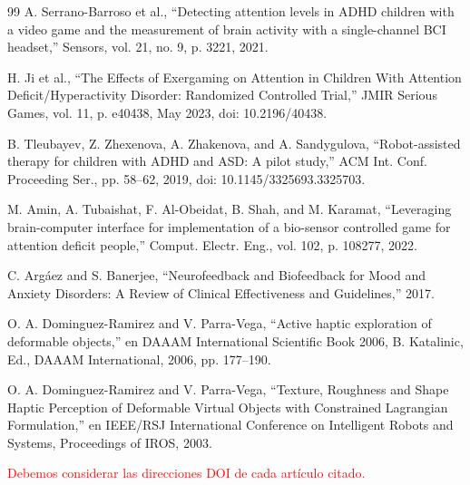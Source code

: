 \documentclass[letterpaper, 10 pt, conference]{ieeeconf}
\begin{document}
\begin{thebibliography}{99}
A. Serrano-Barroso et al., “Detecting attention levels in ADHD children with a video game and the measurement of brain activity with a single-channel BCI headset,” Sensors, vol. 21, no. 9, p. 3221, 2021.

H. Ji et al., “The Effects of Exergaming on Attention in Children With Attention Deficit/Hyperactivity Disorder: Randomized Controlled Trial,” JMIR Serious Games, vol. 11, p. e40438, May 2023, doi: 10.2196/40438.

B. Tleubayev, Z. Zhexenova, A. Zhakenova, and A. Sandygulova, “Robot-assisted therapy for children with ADHD and ASD: A pilot study,” ACM Int. Conf. Proceeding Ser., pp. 58–62, 2019, doi: 10.1145/3325693.3325703.

M. Amin, A. Tubaishat, F. Al-Obeidat, B. Shah, and M. Karamat, “Leveraging brain-computer interface for implementation of a bio-sensor controlled game for attention deficit people,” Comput. Electr. Eng., vol. 102, p. 108277, 2022.

C. Argáez and S. Banerjee, “Neurofeedback and Biofeedback for Mood and Anxiety Disorders: A Review of Clinical Effectiveness and Guidelines,” 2017.

O. A. Dominguez-Ramirez and V. Parra-Vega, “Active haptic exploration of deformable objects,” en DAAAM International Scientific Book 2006, B. Katalinic, Ed., DAAAM International, 2006, pp. 177–190.

O. A. Dominguez-Ramirez and V. Parra-Vega, “Texture, Roughness and Shape Haptic Perception of Deformable Virtual Objects with Constrained Lagrangian Formulation,” en IEEE/RSJ International Conference on Intelligent Robots and Systems, Proceedings of IROS, 2003.




\textcolor{red}{Debemos considerar las direcciones DOI de cada artículo citado.}



\end{thebibliography}
\end{document}
